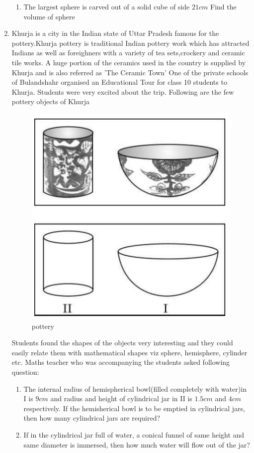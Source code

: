 \begin{enumerate}
\begin{enumerate}
    \item The largest sphere is carved out of a solid cube of side $21cm$ Find the volume of sphere
\end{enumerate}
\item Khurja is a city in the Indian state of Uttar Pradesh famous for the pottery.Khurja pottery is traditional Indian pottery work which has attracted Indians as well as foreighners with a variety of tea sets,crockery and ceramic tile works. A huge portion of the ceramics used in the country is supplied by Khurja and is also referred as 'The Ceramic Town'
One of the private schools of Bulandshahr organised an Educational Tour for class 10 students to Khurja. Students were very excited about the trip. Following are the few pottery objects of Khurja
\begin{figure}[H]
    \centering
    \includegraphics[width=\columnwidth]{figs/pottery9.png}
    \caption{pottery}
    \label{fig:fig9}
\end{figure}
Students found the shapes of the objects very interesting and they could easily relate them with mathematical shapes viz sphere, hemisphere, cylinder etc. Maths teacher who was accompanying the students asked following question:
\begin{enumerate}
    \item The internal radius of hemispherical bowl(filled completely with water)in I is $9cm$ and radius and height of cylindrical jar in II is $1.5cm$ and $4cm$ respectively. If the hemisherical bowl is to be emptied in cylindrical jars, then how many cylindrical jars are required?
    \item If in the cylindrical jar full of water, a conical funnel of same height and same diameter is immersed, then how much water will flow out of the jar?
\end{enumerate}


\end{enumerate}
